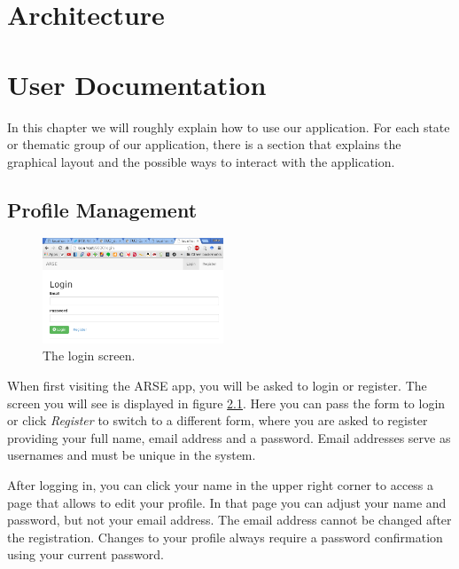 \documentclass[
	accentcolor=tud1a %
]{tudreport}
\begin{document}
\chapter{Architecture}
\label{ch:architecture}

\chapter{User Documentation}
\label{ch:use-documentation}

In this chapter we will roughly explain how to use our application. For each state or thematic group of our application, there is a section that explains the graphical layout and the possible ways to interact with the application.


\section{Profile Management}
\label{sec:profile-mgmt}

\begin{figure}
  	\centering
	\includegraphics[width=0.48\textwidth]{img/login}
	\caption{The login screen.}
	\label{fig:login}
\end{figure}

When first visiting the ARSE app, you will be asked to login or register. The screen you will see is displayed in figure \ref{fig:login}. Here you can pass the form to login or click \emph{Register} to switch to a different form, where you are asked to register providing your full name, email address and a password. Email addresses serve as usernames and must be unique in the system.

After logging in, you can click your name in the upper right corner to access a page that allows to edit your profile. In that page you can adjust your name and password, but not your email address. The email address cannot be changed after the registration. Changes to your profile always require a password confirmation using your current password.
\end{document}

